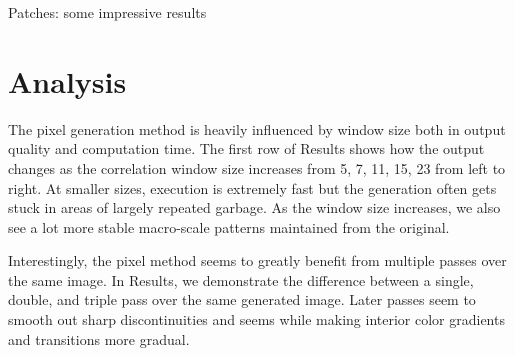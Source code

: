 \documentclass[a4paper, 11pt, titlepage]{article}
\begin{document}
Patches: some impressive results \\

\section{Analysis}
The pixel generation method is heavily influenced by window size both in output quality
and computation time. The first row of Results shows how the output changes as
the correlation window size increases from 5, 7, 11, 15, 23 from left to right.
At smaller sizes, execution is extremely fast but the generation often gets
stuck in areas of largely repeated garbage. As the window size increases, we
also see a lot more stable macro-scale patterns maintained from the original.

Interestingly, the pixel method seems to greatly benefit from multiple passes
over the same image. In Results, we demonstrate the difference between a single,
double, and triple pass over the same generated image. Later passes seem to
smooth out sharp discontinuities and seems while making interior color gradients
and transitions more gradual.
\end{document}
